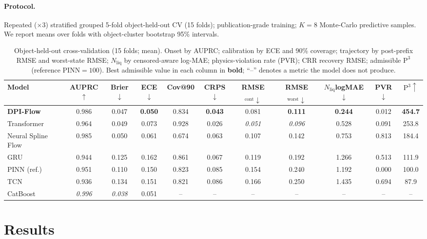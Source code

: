 \documentclass[letterpaper]{article} %
\begin{document}
\paragraph{Protocol.} Repeated ($\times 3$) stratified grouped 5-fold object-held-out CV (15 folds);
publication-grade training; $K{=}8$ Monte-Carlo predictive samples. We report means over folds with
object-cluster bootstrap 95\% intervals.

\begin{table}[t]
\centering
\small
\caption{Object-held-out cross-validation (15 folds; mean). Onset by AUPRC; calibration by ECE and 90\%
coverage; trajectory by post-prefix RMSE and worst-state RMSE; $N_{\mathrm{liq}}$ by censored-aware
log-MAE; physics-violation rate (PVR); CRR recovery RMSE; admissible $\mathrm{P}^3$ (reference PINN${=}100$).
Best admissible value in each column in \textbf{bold}; ``--'' denotes a metric the model does not produce.}
\label{tab:main}
\begin{tabular}{lcccccccccc}
\toprule
Model & AUPRC$\uparrow$ & Brier$\downarrow$ & ECE$\downarrow$ & Cov@90 & CRPS$\downarrow$ & RMSE$_{\text{cont}}\downarrow$ & RMSE$_{\text{worst}}\downarrow$ & $N_{\mathrm{liq}}$logMAE$\downarrow$ & PVR$\downarrow$ & $\mathrm{P}^3\uparrow$ \\
\midrule
\textbf{DPI-Flow}   & 0.986 & 0.047 & \textbf{0.050} & 0.834 & \textbf{0.043} & 0.081 & \textbf{0.111} & \textbf{0.244} & 0.012 & \textbf{454.7} \\
\midrule
Transformer         & 0.964 & 0.049 & 0.073 & 0.928 & 0.026 & \textit{0.051} & \textit{0.096} & 0.528 & 0.091 & 253.8 \\
Neural Spline Flow  & 0.985 & 0.050 & 0.061 & 0.674 & 0.063 & 0.107 & 0.142 & 0.753 & 0.813 & 184.4 \\
GRU                 & 0.944 & 0.125 & 0.162 & 0.861 & 0.067 & 0.119 & 0.192 & 1.266 & 0.513 & 111.9 \\
PINN (ref.)         & 0.951 & 0.110 & 0.150 & 0.823 & 0.085 & 0.154 & 0.240 & 1.192 & 0.000 & 100.0 \\
TCN                 & 0.936 & 0.134 & 0.151 & 0.821 & 0.086 & 0.166 & 0.250 & 1.435 & 0.694 & 87.9 \\
CatBoost            & \textit{0.996} & \textit{0.038} & 0.051 & -- & -- & -- & -- & -- & -- & -- \\
\bottomrule
\end{tabular}
\end{table}

\section{Results}
\end{document}
